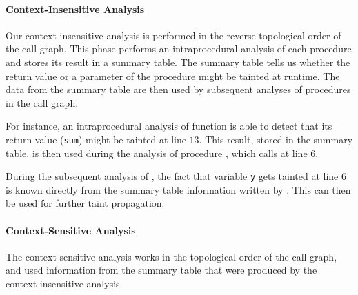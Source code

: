 \paragraph{Context-Insensitive Analysis}
Our context-insensitive analysis is performed
in the reverse topological order of the call graph.
This phase performs an intraprocedural analysis of each
procedure and stores its result in a summary table.
The summary table tells us whether the return value or
a parameter of the procedure might be tainted at runtime.
The data from the summary table are then used by subsequent
analyses of procedures in the call graph. 

For instance, an intraprocedural analysis of function \compute
is able to detect that its return value (\texttt{sum})
might be tainted at line $13$. This result, stored in the
summary table, is then used during the analysis of procedure
\main, which calls \compute at line $6$.

During the subsequent analysis of \main, the fact that variable
\texttt{y} gets tainted at line $6$ is known directly from the
summary table information written by \compute. This can then
be used for further taint propagation.

\paragraph{Context-Sensitive Analysis}
The context-sensitive analysis works in the topological order
of the call graph, and used information from the summary table
that were produced by the context-insensitive analysis.
 
